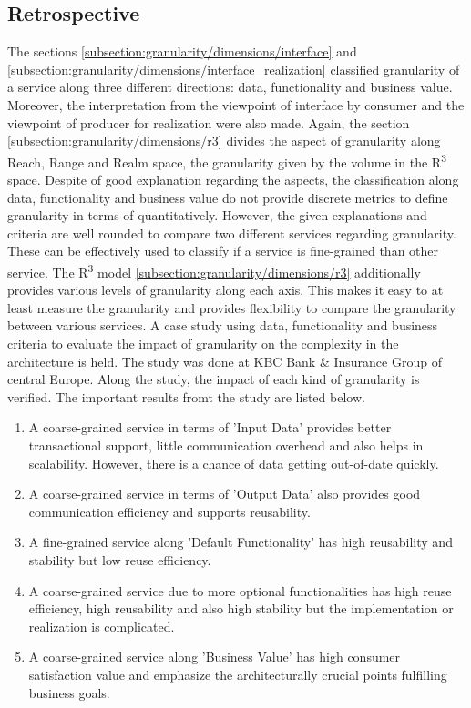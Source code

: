 \subsection{Retrospective}\label{subsection:granularity/dimensions/retrospective}
The sections \ref{subsection:granularity/dimensions/interface} and \ref{subsection:granularity/dimensions/interface_realization} classified granularity of a service along three different directions: data, functionality and business value. Moreover, the interpretation from the viewpoint of interface by consumer and the viewpoint of producer for realization were also made.
Again, the section \ref{subsection:granularity/dimensions/r3} divides the aspect of granularity along Reach, Range and Realm space, the granularity given by the volume in the R\textsuperscript{3} space.
Despite of good explanation regarding the aspects, the classification along data, functionality and business value do not provide discrete metrics to define granularity in terms of quantitatively. However, the given explanations and criteria are well rounded to compare two different services regarding granularity. These can be effectively used to classify if a service is fine-grained than other service.
The R\textsuperscript{3} model \ref{subsection:granularity/dimensions/r3} additionally provides various levels of granularity along each axis. This makes it easy to at least measure the granularity and provides flexibility to compare the granularity between various services.
A case study \cite{Pierre-Reldin:2007aa} using data, functionality and business criteria to evaluate the impact of granularity on the complexity in the architecture is held. The study was done at KBC Bank & Insurance Group of central Europe. Along the study, the impact of each kind of granularity is verified. The important results fromt the study are listed below.

\begin{enumerate}
\item A coarse-grained service in terms of 'Input Data' provides better transactional support, little communication overhead and also helps in scalability. However, there is a chance of data getting out-of-date quickly.
\item A coarse-grained service in terms of 'Output Data' also provides good communication efficiency and supports reusability.
\item A fine-grained service along 'Default Functionality' has high reusability and stability but low reuse efficiency.
\item A coarse-grained service due to more optional functionalities has high reuse efficiency, high reusability and also high stability but the implementation or realization is complicated.
\item A coarse-grained service along 'Business Value' has high consumer satisfaction value and emphasize the architecturally crucial points fulfilling business goals.
\end{enumerate}

